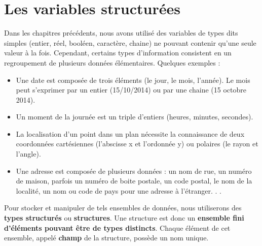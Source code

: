 \documentclass[11pt,a4paper]{article}
\begin{document}
            \section{Les variables structur\'ees}
        Dans les chapitres pr\'ec\'edents, nous avons utilis\'e des variables de types dits \guillemotleft  simples \guillemotright 
        (entier, r\'eel, bool\'een, caract\`ere, chaine) ne pouvant contenir qu'une seule valeur \`a la fois.
        Cependant, certains types d'information consistent en un regroupement de plusieurs donn\'ees
        \'el\'ementaires. Quelques exemples :
        
					\begin{itemize}
				
			\item Une date est compos\'ee de trois \'el\'ements (le jour, le mois, l'ann\'ee). Le mois peut
            s'exprimer par un entier (15/10/2014) ou par une chaine (15 octobre 2014).
          
			\item 
            Un moment de la journ\'ee est un triple d'entiers (heures, minutes, secondes).
          
			\item 
            La localisation d'un point dans un plan n\'ecessite la connaissance de deux coordonn\'ees
            cart\'esiennes (l'abscisse x et l'ordonn\'ee y) ou polaires (le rayon et l'angle).
          
			\item 
            Une adresse est compos\'ee de plusieurs donn\'ees : un nom de rue, un num\'ero de maison,
            parfois un num\'ero de boite postale, un code postal, le nom de la localit\'e, un nom ou
            code de pays pour une adresse \`a l'\'etranger. . .
          
					\end{itemize}
				
            \par
        
        Pour stocker et manipuler de tels ensembles de donn\'ees, nous utiliserons des 
        \textbf{types structur\'es} ou \textbf{structures}. 
        Une structure est donc un \textbf{ensemble fini d'\'el\'ements pouvant \^etre de types distincts}. 
        Chaque \'el\'ement de cet ensemble, appel\'e \textbf{champ} de la structure, poss\`ede un nom unique.
      
            \par
        
\end{document}
